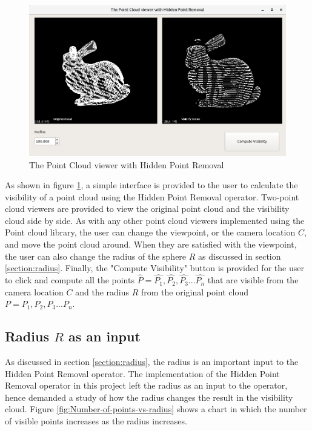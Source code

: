 \documentclass[11pt]{article}
\begin{document}
\begin{figure}[h]
\includegraphics[width=12cm]{point_cloud_library_with_HPR}
\centering
\caption{The Point Cloud viewer with Hidden Point Removal}
\label{fig:point_cloud_library_with_HPR}
\end{figure}

As shown in figure \ref{fig:point_cloud_library_with_HPR}, a simple interface is provided to the user to calculate the visibility of a point cloud using the Hidden Point Removal operator. Two-point cloud viewers are provided to view the original point cloud and the visibility cloud side by side. As with any other point cloud viewers implemented using the Point cloud library, the user can change the viewpoint, or the camera location $C$, and move the point cloud around. When they are satisfied with the viewpoint, the user can also change the radius of the sphere $R$ as discussed in section \ref{section:radius}. Finally, the "Compute Visibility" button is provided for the user to click and compute all the points $\widehat{P} = \hat{P_{1}},\hat{P_{2}},\hat{P_{3}} ... \hat{P_{n}}$ that are visible from the camera location $C$ and the radius $R$ from the original point cloud $ P = P_{1},P_{2},P_{3} ... P_{n} $.

\subsection{Radius $R$ as an input}
As discussed in section \ref{section:radius}, the radius is an important input to the Hidden Point Removal operator. The implementation of the Hidden Point Removal operator in this project left the radius as an input to the operator, hence demanded a study of how the radius changes the result in the visibility cloud. Figure \ref{fig:Number-of-points-vs-radius} shows a chart in which the number of visible points increases as the radius increases.  
\end{document}
